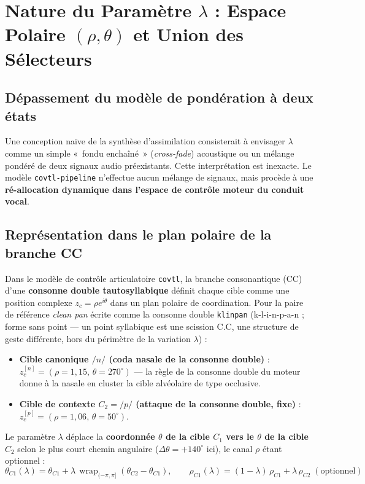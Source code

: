 \documentclass[11pt,a4paper]{article}
\begin{document}
\section{Nature du Paramètre $\lambda$ : Espace Polaire $(\rho, \theta)$ et Union des Sélecteurs}

\subsection{Dépassement du modèle de pondération à deux états}
Une conception naïve de la synthèse d'assimilation consisterait à envisager $\lambda$ comme un simple «~fondu enchaîné~» (\textit{cross-fade}) acoustique ou un mélange pondéré de deux signaux audio préexistants. Cette interprétation est inexacte. Le modèle \texttt{covtl-pipeline} n'effectue aucun mélange de signaux, mais procède à une \textbf{ré-allocation dynamique dans l'espace de contrôle moteur du conduit vocal}.

\subsection{Représentation dans le plan polaire de la branche CC}
Dans le modèle de contrôle articulatoire \texttt{covtl}, la branche consonantique (CC) d'une \textbf{consonne double tautosyllabique} définit chaque cible comme une position complexe $z_c = \rho e^{i\theta}$ dans un plan polaire de coordination. Pour la paire de référence \textit{clean pan} écrite comme la consonne double \texttt{klinpan} (k-l-i-n-p-a-n ; forme sans point --- un point syllabique est une scission C.C, une structure de geste différente, hors du périmètre de la variation $\lambda$) :
\begin{itemize}[leftmargin=*]
    \item \textbf{Cible canonique $/n/$ (coda nasale de la consonne double)} : $z_c^{[n]} = (\rho = 1{,}15,\, \theta = 270^\circ)$ --- la règle de la consonne double du moteur donne à la nasale en cluster la cible alvéolaire de type occlusive.
    \item \textbf{Cible de contexte $C_2 = /p/$ (attaque de la consonne double, fixe)} : $z_c^{[p]} = (\rho = 1{,}06,\, \theta = 50^\circ)$.
\end{itemize}

Le paramètre $\lambda$ déplace la \textbf{coordonnée $\theta$ de la cible $C_1$ vers le $\theta$ de la cible $C_2$} selon le plus court chemin angulaire ($\Delta\theta = +140^\circ$ ici), le canal $\rho$ étant optionnel :
\begin{equation}
\theta_{C1}(\lambda) = \theta_{C1} + \lambda \,\operatorname{wrap}_{(-\pi,\pi]}\!\left(\theta_{C2} - \theta_{C1}\right),
\qquad \rho_{C1}(\lambda) = (1-\lambda)\,\rho_{C1} + \lambda\,\rho_{C2} \;(\text{optionnel})
\end{equation}
\end{document}
